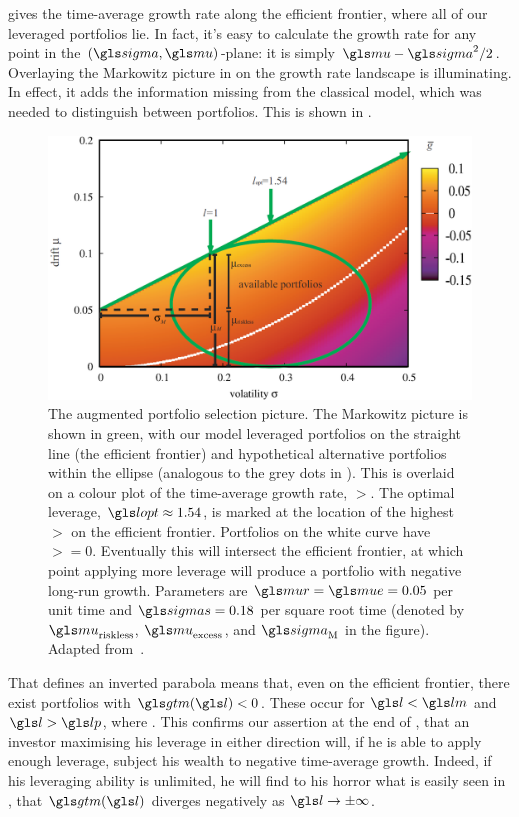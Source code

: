  gives the time-average growth rate along the efficient frontier, where all of our leveraged portfolios lie. In fact, it's easy to calculate the growth rate for any point in the $(\gsigma,\gmu)$-plane: it is simply $\gmu-\gsigma^2/2$. Overlaying the Markowitz picture in  on the growth rate landscape is illuminating. In effect, it adds the information missing from the classical model, which was needed to distinguish between portfolios. This is shown in .
\begin{figure}
\centering
\includegraphics[width=\textwidth]{./chapter_4/figs/markowitz_peters.png}
\caption{The augmented portfolio selection picture. The Markowitz picture is shown in green, with our model leveraged portfolios on the straight line (the efficient frontier) and hypothetical alternative portfolios within the ellipse (analogous to the grey dots in ). This is overlaid on a colour plot of the time-average growth rate, $\gt$. The optimal leverage, $\lopt\approx1.54$, is marked at the location of the highest $\gt$ on the efficient frontier. Portfolios on the white curve have $\gt=0$. Eventually this will intersect the efficient frontier, at which point applying more leverage will produce a portfolio with negative long-run growth. Parameters are $\mur=\mue=0.05$ per unit time and $\sigmas=0.18$ per square root time (denoted by $\gmu_\text{riskless}$, $\gmu_\text{excess}$, and $\gsigma_\text{M}$ in the figure). Adapted from~\cite{Peters2011a}.}
\end{figure}

That  defines an inverted parabola means that, even on the efficient frontier, there exist portfolios with $\gtm(\l) < 0$. These occur for $\l<\lm$ and $\l>\lp$, where
\be 
\lpm \equiv \lopt \pm {}.
\ee
This confirms our assertion at the end of , that an investor maximising his leverage in either direction will, if he is able to apply enough leverage, subject his wealth to negative time-average growth. Indeed, if his leveraging ability is unlimited, he will find to his horror what is easily seen in , that $\gtm(\l)$ diverges negatively as $\l\to\pm\infty$.

